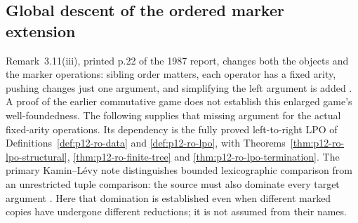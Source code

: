 \subsection{Global descent of the ordered marker extension}
\label{sec:p12-klop1987-ordered-marker-proof}

Remark~3.11(iii), printed p.22 of the 1987 report, changes both the
objects and the marker operations: sibling order matters, each operator
has a fixed arity, pushing changes just one argument, and simplifying
the left argument is added \parencite{Klop1987CWITutorial}. A proof of
the earlier commutative game does not establish this enlarged game's
well-foundedness. The following supplies that missing argument for
the actual fixed-arity operations. Its dependency is the fully proved
left-to-right LPO of Definitions~\ref{def:p12-ro-data} and
\ref{def:p12-ro-lpo}, with Theorems~\ref{thm:p12-ro-lpo-structural},
\ref{thm:p12-ro-finite-tree} and \ref{thm:p12-ro-lpo-termination}.
The primary Kamin--L\'evy note distinguishes bounded lexicographic
comparison from an unrestricted tuple comparison: the source must also
dominate every target argument
\parencite[handwritten pp.1--8]{KaminLevy1980Attempts}.
Here that domination is established even when different marked copies
have undergone different reductions; it is not assumed from their names.

